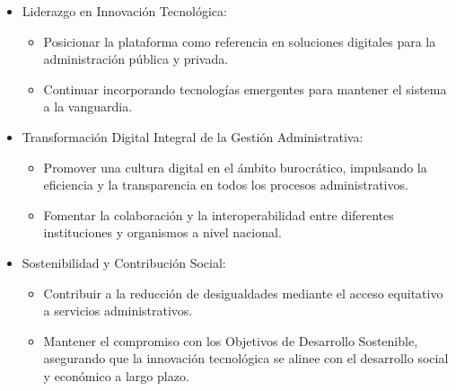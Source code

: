 \begin{itemize}
    \item Liderazgo en Innovación Tecnológica:
    \begin{itemize}
        \item Posicionar la plataforma como referencia en soluciones digitales para la administración pública y privada.
        \item Continuar incorporando tecnologías emergentes para mantener el sistema a la vanguardia.
    \end{itemize}
    \item Transformación Digital Integral de la Gestión Administrativa:
    \begin{itemize}
        \item Promover una cultura digital en el ámbito burocrático, impulsando la eficiencia y la transparencia en todos los procesos administrativos.
        \item Fomentar la colaboración y la interoperabilidad entre diferentes instituciones y organismos a nivel nacional.
    \end{itemize}
    \item Sostenibilidad y Contribución Social:
    \begin{itemize}
        \item Contribuir a la reducción de desigualdades mediante el acceso equitativo a servicios administrativos.
        \item Mantener el compromiso con los Objetivos de Desarrollo Sostenible, asegurando que la innovación tecnológica se alinee con el desarrollo social y económico a largo plazo.
    \end{itemize}
\end{itemize}

